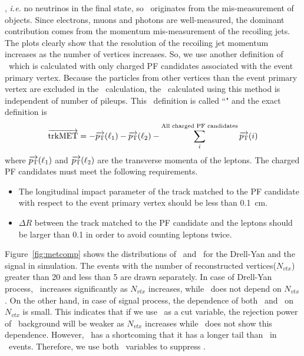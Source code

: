 \met, \textit{i.e.} no neutrinos in the final state, so \met\ originates from 
the mis-measurement of objects. Since electrons, muons 
and photons are well-measured, the dominant contribution comes from the momentum 
mis-measurement of the recoiling jets. The plots clearly show that the resolution 
of the recoiling jet momentum increases as the number of vertices increases.   
So, we use another definition of \met\ which is calculated with only charged 
PF candidates associated with the event primary vertex. Because the particles from 
other vertices than the event primary vertex are excluded in the \met\ calculation,
the \met\ calculated using this method is independent of number of pileups.  
This \met\ definition is called ``\trkmet" and the exact definition is
\begin{eqnarray} 
\overrightarrow{\mathrm{trkMET}} 
= 
- \overrightarrow{p_\mathrm{T}} (\ell_1)  
- \overrightarrow{p_\mathrm{T}} (\ell_2)  
- \sum^{\textrm{All charged PF candidates}}_i \overrightarrow{p_\mathrm{T}}(i)
\end{eqnarray} 
where $\overrightarrow{p_\mathrm{T}} (\ell_1)$ and $\overrightarrow{p_\mathrm{T}} (\ell_2)$
are the transverse momenta of the leptons. The charged PF candidates must 
meet the following requirements.
\begin{itemize}
\item The longitudinal impact parameter of the track matched to the PF candidate 
      with respect to the event primary vertex should be less than 0.1~cm. 
\item $\Delta R$ between the track matched to the PF candidate and the leptons 
      should be larger than 0.1 in order to avoid counting leptons twice. 
\end{itemize}

Figure~\ref{fig:metcomp} shows the distributions of \pfmet\ and \trkmet\ 
for the Drell-Yan and the signal in simulation. The events with the number 
of reconstructed vertices($N_{vtx}$) greater than 20 and less than 5 
are drawn separately. In case of Drell-Yan process, \pfmet\ increases 
significantly as $N_{vtx}$ increases, while \trkmet\ does not depend 
on $N_{vtx}$. 
On the other hand, in case of signal process, the dependence 
of both \pfmet\ and \trkmet\ on $N_{vtx}$ is small. 
This indicates that if we use \pfmet\ as a cut variable, 
the rejection power of \dyll\ background will be weaker 
as $N_{vtx}$ increases while \trkmet\ does not show this 
dependence. However, \trkmet\ has a shortcoming that it has 
a longer tail than \pfmet\ in \dyll\ events. 
Therefore, we use both \met\ variables to suppress \dyll.

